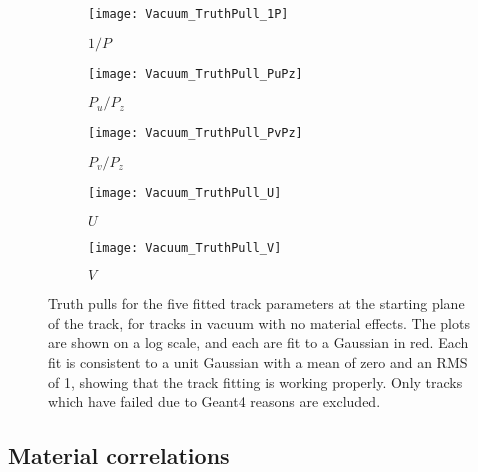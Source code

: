     \begin{figure}[]
    \centering
        \begin{subfigure}[t]{0.45\textwidth}
            \centering
            \texttt{[image: Vacuum\_TruthPull\_1P]}
            \caption{$1/P$}
        \end{subfigure}%

        \vspace{2mm}
        \begin{subfigure}[t]{0.45\textwidth}
            \centering
            \texttt{[image: Vacuum\_TruthPull\_PuPz]}
            \caption{$P_{u}/P_{z}$}
        \end{subfigure}
        \begin{subfigure}[t]{0.45\textwidth}
            \centering
            \texttt{[image: Vacuum\_TruthPull\_PvPz]}
            \caption{$P_{v}/P_{z}$}
        \end{subfigure}%
        \vspace{2mm}
        \begin{subfigure}[t]{0.45\textwidth}
            \centering
            \texttt{[image: Vacuum\_TruthPull\_U]}
            \caption{$U$}
        \end{subfigure}
        \begin{subfigure}[t]{0.45\textwidth}
            \centering
            \texttt{[image: Vacuum\_TruthPull\_V]}
            \caption{$V$}
        \end{subfigure}%
    \caption[Track parameter truth pulls for fitted tracks in vacuum]{Truth pulls for the five fitted track parameters at the starting plane of the track, for tracks in vacuum with no material effects. The plots are shown on a log scale, and each are fit to a Gaussian in red. Each fit is consistent to a unit Gaussian with a mean of zero and an RMS of 1, showing that the track fitting is working properly. Only tracks which have failed due to Geant4 reasons are excluded.}
    \label{fig:VacuumTruthPulls}
    \end{figure}



\subsection{Material correlations}



